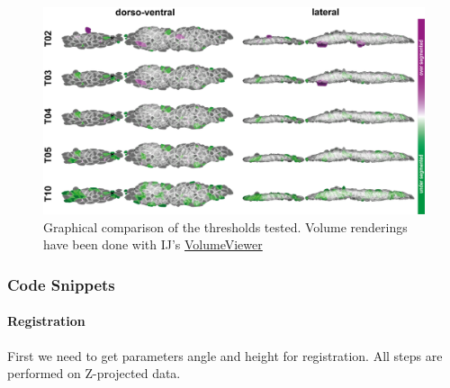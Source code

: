 \documentclass[10pt, b5paper, singlespacinge, twoside]{reedthesis} %
\theoremstyle{definition}
\theoremstyle{definition}
\theoremstyle{definition}
\theoremstyle{remark}
\begin{document}
\begin{figure}

{\centering \includegraphics[width=0.85\linewidth]{figures/materials/ground_truth/volumes} 

}

\caption[anaLLzr3D - Graphical comparison of tested thresholds]{Graphical comparison of the thresholds tested. Volume renderings have been done with IJ's \href{\%22https://github.com/fiji/Volume_Viewer/releases/tag/Volume_Viewer-2.01.2\%22}{VolumeViewer}}\label{fig:anallzrvols}
\end{figure}
\noindent 

\hypertarget{code-snippets-1}{%
\subsubsection{Code Snippets}\label{code-snippets-1}}

\hypertarget{registration-2}{%
\paragraph{Registration}\label{registration-2}}

First we need to get parameters angle and height for registration. All steps are performed on Z-projected data.
\end{document}
